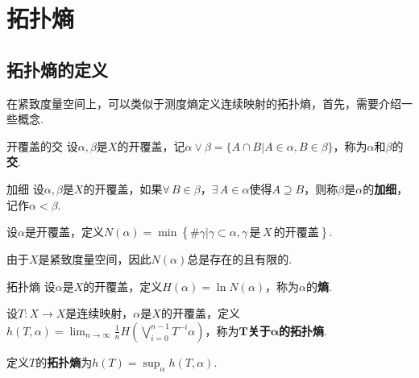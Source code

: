 \chapter{拓扑熵}

\section{拓扑熵的定义}

在紧致度量空间上，可以类似于测度熵定义连续映射的拓扑熵，首先，需要介绍一些概念.\par

\begin{definition}{开覆盖的交}
    设$\alpha,\beta$是$X$的开覆盖，记$\alpha\vee\beta=\{A\cap B|A\in\alpha,B\in\beta\}$，称为$\alpha$和$\beta$的\textbf{交}.
\end{definition}

\begin{definition}{加细}
    设$\alpha,\beta$是$X$的开覆盖，如果$\forall\,B\in\beta$，$\exists\,A\in\alpha$使得$A\supseteq B$，则称$\beta$是$\alpha$的\textbf{加细}，记作$\alpha<\beta$.
\end{definition}

\begin{definition}{}
    设$\alpha$是开覆盖，定义$N(\alpha)=\min \left\{\#\gamma|\gamma\subset \alpha,\gamma\,\text{是}\,X\,\text{的开覆盖}\right\}$.
\end{definition}
由于$X$是紧致度量空间，因此$N(\alpha)$总是存在的且有限的.

\begin{definition}{拓扑熵}
    设$\alpha$是$X$的开覆盖，定义$H(\alpha)=\ln{N(\alpha)}$，称为$\alpha$的\textbf{熵}.\par
    设$T:X\to X$是连续映射，$\alpha$是$X$的开覆盖，定义$h(T,\alpha)=\lim_{n\to\infty}{\frac{1}{n}H\left(\bigvee_{i=0}^{n-1}T^{-i}\alpha\right)}$，称为\textbf{$\bm{T}$关于$\bm{\alpha}$的拓扑熵}.\par
    定义$T$的\textbf{拓扑熵}为$h(T)=\sup_{\alpha}h(T,\alpha)$.
\end{definition}

